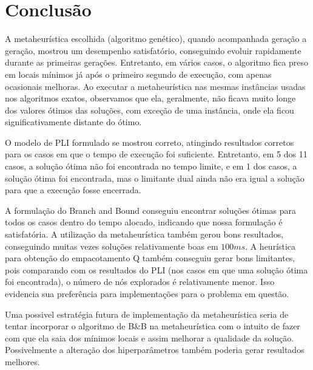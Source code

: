 \documentclass[a4paper,11pt]{article}
\begin{document}
\section{Conclusão}
A metaheurística escolhida (algoritmo genético), quando acompanhada geração a geração, mostrou
um desempenho satisfatório, conseguindo evoluir rapidamente durante as primeiras gerações. Entretanto,
em vários casos, o algoritmo fica preso em locais mínimos já após o primeiro segundo de execução,
com apenas ocasionais melhoras.
Ao executar a metaheurística nas mesmas instâncias usadas nos algoritmos exatos, observamos que ela, geralmente,
não ficava muito longe dos valores ótimos das soluções, com exceção de uma instância,
onde ela ficou significativamente distante do ótimo.

O modelo de PLI formulado se mostrou correto, atingindo resultados corretos para os casos em que
o tempo de execução foi suficiente. Entretanto, em 5 dos 11 casos, a solução ótima não foi encontrada
no tempo limite, e em 1 dos casos, a solução ótima foi encontrada, mas o limitante dual ainda não era
igual a solução para que a execução fosse encerrada.

A formulação do Branch and Bound conseguiu encontrar soluções ótimas para todos os casos dentro
do tempo alocado, indicando que nossa formulação é satisfatória. A utilização da metaheurística
também gerou bons resultados, conseguindo muitas vezes soluções relativamente boas em $100ms$.
A heurística para obtenção do empacotamento Q também conseguiu gerar bons limitantes, pois
comparando com os resultados do PLI (nos casos em que uma solução ótima foi encontrada),
o número de nós explorados é relativamente menor.
Isso evidencia sua preferência para implementações para o problema em questão.

Uma possivel estratégia futura de implementação da metaheurística seria de tentar incorporar
o algoritmo de B\&B na metaheurística com o intuito de fazer com que ela saia dos mínimos locais
e assim melhorar a qualidade da solução.
Possivelmente a alteração dos hiperparâmetros também poderia gerar resultados melhores.
\end{document}
